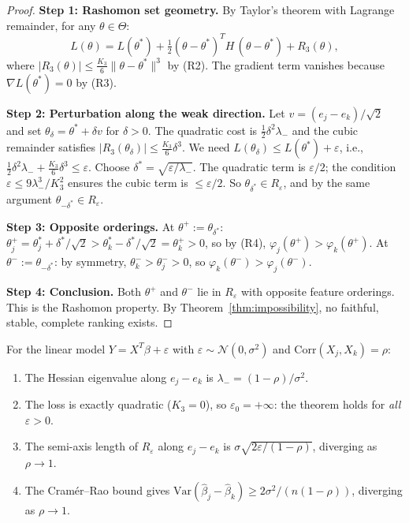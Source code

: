 \documentclass{jmlr}
\newcommand{\Var}{\mathrm{Var}}
\begin{document}
\begin{proof}
\textbf{Step 1: Rashomon set geometry.}
By Taylor's theorem with Lagrange remainder, for any $\theta \in \Theta$:
\[
    L(\theta) = L(\theta^*) + \tfrac{1}{2}(\theta - \theta^*)^T H\, (\theta - \theta^*) + R_3(\theta),
\]
where $|R_3(\theta)| \leq \frac{K_3}{6}\|\theta - \theta^*\|^3$ by (R2). The gradient term vanishes because $\nabla L(\theta^*) = 0$ by (R3).

\textbf{Step 2: Perturbation along the weak direction.}
Let $v = (e_j - e_k)/\sqrt{2}$ and set $\theta_\delta = \theta^* + \delta v$ for $\delta > 0$. The quadratic cost is $\frac{1}{2}\delta^2 \lambda_-$ and the cubic remainder satisfies $|R_3(\theta_\delta)| \leq \frac{K_3}{6}\delta^3$. We need $L(\theta_\delta) \leq L(\theta^*) + \varepsilon$, i.e., $\frac{1}{2}\delta^2 \lambda_- + \frac{K_3}{6}\delta^3 \leq \varepsilon$. Choose $\delta^* = \sqrt{\varepsilon/\lambda_-}$. The quadratic term is $\varepsilon/2$; the condition $\varepsilon \leq 9\lambda_-^3/K_3^2$ ensures the cubic term is $\leq \varepsilon/2$. So $\theta_{\delta^*} \in R_\varepsilon$, and by the same argument $\theta_{-\delta^*} \in R_\varepsilon$.

\textbf{Step 3: Opposite orderings.}
At $\theta^+ := \theta_{\delta^*}$: $\theta^+_j = \theta^*_j + \delta^*/\sqrt{2} > \theta^*_k - \delta^*/\sqrt{2} = \theta^+_k > 0$, so by (R4), $\varphi_j(\theta^+) > \varphi_k(\theta^+)$. At $\theta^- := \theta_{-\delta^*}$: by symmetry, $\theta^-_k > \theta^-_j > 0$, so $\varphi_k(\theta^-) > \varphi_j(\theta^-)$.

\textbf{Step 4: Conclusion.}
Both $\theta^+$ and $\theta^-$ lie in $R_\varepsilon$ with opposite feature orderings. This is the Rashomon property. By Theorem~\ref{thm:impossibility}, no faithful, stable, complete ranking exists.
\end{proof}

\begin{proposition}
\label{prop:gaussian-fim}
For the linear model $Y = X^T\beta + \varepsilon$ with $\varepsilon \sim \mathcal{N}(0, \sigma^2)$ and $\text{Corr}(X_j, X_k) = \rho$:
\begin{enumerate}
    \item The Hessian eigenvalue along $e_j - e_k$ is $\lambda_- = (1-\rho)/\sigma^2$.
    \item The loss is exactly quadratic ($K_3 = 0$), so $\varepsilon_0 = +\infty$: the theorem holds for \emph{all} $\varepsilon > 0$.
    \item The semi-axis length of $R_\varepsilon$ along $e_j - e_k$ is $\sigma\sqrt{2\varepsilon/(1-\rho)}$, diverging as $\rho \to 1$.
    \item The Cram\'er--Rao bound gives $\Var(\hat\beta_j - \hat\beta_k) \geq 2\sigma^2/(n(1-\rho))$, diverging as $\rho \to 1$.
\end{enumerate}
\end{proposition}
\end{document}
